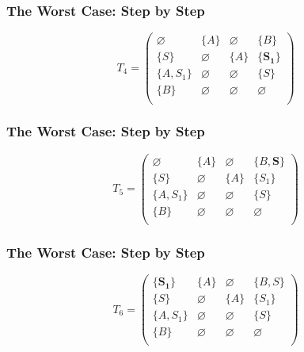 \documentclass[xcolor=table]{beamer}
\begin{document}
\begin{frame}[noframenumbering]

  \frametitle{The Worst Case: Step by Step}
\begin{figure}[h]
\[
T_4 = \begin{pmatrix}
\varnothing & \{A\}       & \varnothing & \{B\}       \\
\{S\}       & \varnothing & \{A\}       & \{\pmb{S_1}\}     \\
\{A, S_1\}  & \varnothing & \varnothing & \{S\}       \\
\{B\}       & \varnothing & \varnothing & \varnothing \\
\end{pmatrix}
\]
\label{ExampleQueryFirstIteration}
\end{figure}
\end{frame}

\begin{frame}[noframenumbering]

  \frametitle{The Worst Case: Step by Step}
\begin{figure}[h]
\[
T_5 = \begin{pmatrix}
\varnothing & \{A\}       & \varnothing & \{B, \pmb{S}\}    \\
\{S\}       & \varnothing & \{A\}       & \{S_1\}     \\
\{A, S_1\}  & \varnothing & \varnothing & \{S\}       \\
\{B\}       & \varnothing & \varnothing & \varnothing \\
\end{pmatrix}
\]
\label{ExampleQueryFirstIteration}
\end{figure}
\end{frame}

\begin{frame}[noframenumbering]

  \frametitle{The Worst Case: Step by Step}
\begin{figure}[h]
\[
T_6 = \begin{pmatrix}
\{\pmb{S_1}\}     & \{A\}       & \varnothing & \{B, S\}    \\
\{S\}       & \varnothing & \{A\}       & \{S_1\}     \\
\{A, S_1\}  & \varnothing & \varnothing & \{S\}       \\
\{B\}       & \varnothing & \varnothing & \varnothing \\
\end{pmatrix}
\]
\label{ExampleQueryFirstIteration}
\end{figure}
\end{frame}
\end{document}
